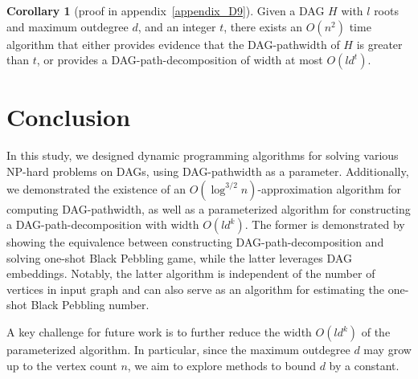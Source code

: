 \documentclass[runningheads]{llncs}
\theoremstyle{plain}
\newtheorem{cor}{Corollary}
\theoremstyle{definition}
\newtheorem{cor}{Corollary}
\begin{document}
\begin{cor}[proof in appendix~\ref{appendix_D9}]\label{cor}
    Given a DAG $H$ with $l$ roots and maximum outdegree $d$, and an integer $t$, there exists an $O(n^2)$ time algorithm that either provides evidence that the DAG-pathwidth of $H$ is greater than $t$, or provides a DAG-path-decomposition of width at most $O(ld^t)$.
\end{cor}








































\section{Conclusion}

In this study, we designed dynamic programming algorithms for solving various NP-hard problems on DAGs, using DAG-pathwidth as a parameter. Additionally, we demonstrated the existence of an $O(\log^{3/2} n)$-approximation algorithm for computing DAG-pathwidth, as well as a parameterized algorithm for constructing a DAG-path-decomposition with width $O(ld^k)$. The former is demonstrated by showing the equivalence between constructing DAG-path-decomposition and solving one-shot Black Pebbling game, while the latter leverages DAG embeddings. Notably, the latter algorithm is independent of the number of vertices in input graph and can also serve as an algorithm for estimating the one-shot Black Pebbling number.

A key challenge for future work is to further reduce the width $O(ld^k)$ of the parameterized algorithm. In particular, since the maximum outdegree $d$ may grow up to the vertex count $n$, we aim to explore methods to bound $d$ by a constant.
\end{document}
